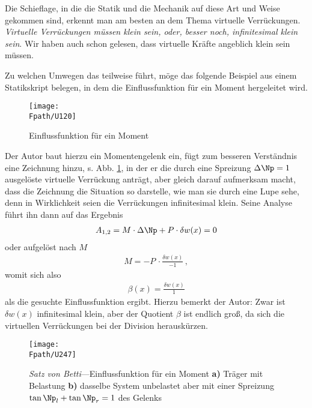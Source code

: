 Die Schieflage,  in die die Statik und die Mechanik auf diese Art und Weise gekommen sind, erkennt man am besten an dem Thema virtuelle Verr\"{u}ckungen. {\em \glq Virtuelle Verr\"{u}ckungen m\"{u}ssen klein sein, oder, besser noch, infinitesimal klein sein\grq{}\/}. Wir haben auch schon gelesen, dass virtuelle Kr\"{a}fte angeblich klein sein m\"{u}ssen.

Zu welchen \glq Umwegen\grq{} das teilweise f\"{u}hrt, m\"{o}ge das folgende Beispiel aus einem Statikskript belegen, in dem die Einflussfunktion f\"{u}r ein Moment hergeleitet wird.
\begin{figure}[tbp]
\centering
\if {} \sidecaption \fi
\texttt{[image: \\Fpath/U120]}
\caption{Einflussfunktion f\"{u}r ein Moment} \label{U120}
\end{figure}%

Der Autor baut hierzu ein Momentengelenk ein, f\"{u}gt zum besseren Verst\"{a}ndnis eine Zeichnung hinzu, s. Abb. \ref{U120}, in der er die durch eine  Spreizung \glq $\Delta \Np = 1$\grq{} ausgel\"{o}ste virtuelle Verr\"{u}ckung antr\"{a}gt, aber gleich darauf aufmerksam macht, dass die Zeichnung die Situation so darstelle, \glq wie man sie durch eine Lupe\grq{} sehe, denn in Wirklichkeit seien die Verr\"{u}ckungen infinitesimal klein. Seine Analyse f\"{u}hrt ihn dann auf das Ergebnis
\begin{align}
A_{1,2} = M \cdot \Delta \Np + P\cdot \delta w(x) = 0
\end{align}
oder aufgel\"{o}st nach $M$
\begin{align}
M = - P\,\cdot \frac{\delta w(x)}{- 1}\,,
\end{align}
womit sich also
\begin{align}
\beta(x) = \frac{\delta w(x)}{1}
\end{align}
als die gesuchte Einflussfunktion ergibt. Hierzu bemerkt der Autor: \glq Zwar ist $\delta w(x)$ infinitesimal klein, aber der Quotient $\beta$ ist endlich gro{\ss}, da sich die virtuellen Verr\"{u}ckungen bei der Division herausk\"{u}rzen.\grq{}
\begin{figure}[tbp]
\centering
\if {} \sidecaption \fi
\texttt{[image: \\Fpath/U247]}
\caption{{\em Satz von Betti\/}---Einflussfunktion f\"{u}r ein Moment \textbf{ a)} Tr\"{a}ger mit Belastung \textbf{ b)} dasselbe System unbelastet aber mit einer Spreizung $\tan \Np_l + \tan \Np_r = 1$ des Gelenks} \label{U247A}
\end{figure}%

